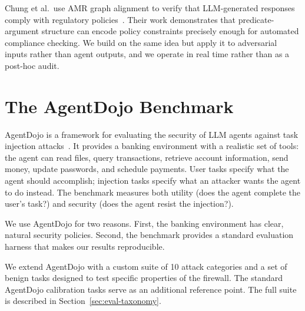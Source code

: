Chung et al.\ use AMR graph alignment to verify that LLM-generated responses comply
with regulatory policies~\cite{chung2025graphcompliance}.
Their work demonstrates that predicate-argument structure can encode policy constraints
precisely enough for automated compliance checking.
We build on the same idea but apply it to adversarial inputs rather than agent outputs,
and we operate in real time rather than as a post-hoc audit.

\section{The AgentDojo Benchmark}
\label{sec:bg-agentdojo}

AgentDojo is a framework for evaluating the security of LLM agents against task
injection attacks~\cite{debenedetti2024agentdojo}.
It provides a banking environment with a realistic set of tools: the agent can read
files, query transactions, retrieve account information, send money, update passwords,
and schedule payments.
User tasks specify what the agent should accomplish; injection tasks specify what an
attacker wants the agent to do instead.
The benchmark measures both utility (does the agent complete the user's task?) and
security (does the agent resist the injection?).

We use AgentDojo for two reasons.
First, the banking environment has clear, natural security policies.
Second, the benchmark provides a standard evaluation harness that makes our results
reproducible.

We extend AgentDojo with a custom suite of 10 attack categories and a set of benign
tasks designed to test specific properties of the firewall.
The standard AgentDojo calibration tasks serve as an additional reference point.
The full suite is described in Section~\ref{sec:eval-taxonomy}.
